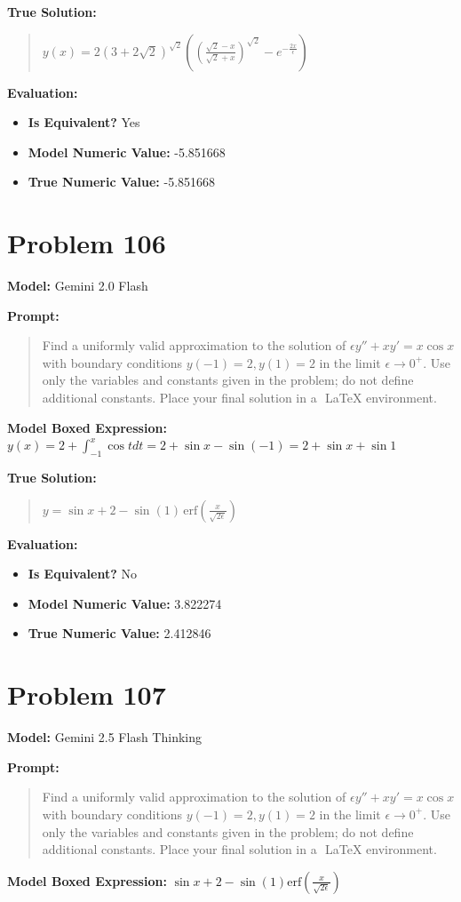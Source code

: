 \documentclass{article}
\begin{document}
{\textbf{True Solution:}
\begin{quote}
$y(x)=2(3+2\sqrt{2})^\sqrt{2}((\frac{\sqrt{2}-x}{\sqrt{2}+x})^\sqrt{2}-e^{-\frac{2x}{\epsilon}})$
\end{quote}

\textbf{Evaluation:}
\begin{itemize}
\item \textbf{Is Equivalent?} Yes
\item \textbf{Model Numeric Value:} -5.851668
\item \textbf{True Numeric Value:} -5.851668
\end{itemize}
\vspace{1cm}
\section*{Problem 106}
\textbf{Model:} Gemini 2.0 Flash

\textbf{Prompt:}
\begin{quote}
Find a uniformly valid approximation to the solution of $\epsilon y'' + x y' = x \cos x$ with boundary conditions $y(-1) = 2, y(1) = 2$ in the limit $\epsilon \to 0^+$. Use only the variables and constants given in the problem; do not define additional constants. Place your final solution in a $\boxed{}$ LaTeX environment.
\end{quote}
\textbf{Model Boxed Expression:} $y(x) = 2 + \int_{-1}^x \cos t dt = 2 + \sin x - \sin(-1) = 2 + \sin x + \sin 1$

\textbf{True Solution:}
\begin{quote}
$y = \sin x + 2 - \sin(1) \, \mathrm{erf}\left(\frac{x}{\sqrt{2\epsilon}}\right)$
\end{quote}

\textbf{Evaluation:}
\begin{itemize}
\item \textbf{Is Equivalent?} No
\item \textbf{Model Numeric Value:} 3.822274
\item \textbf{True Numeric Value:} 2.412846
\end{itemize}
\vspace{1cm}
\section*{Problem 107}
\textbf{Model:} Gemini 2.5 Flash Thinking

\textbf{Prompt:}
\begin{quote}
Find a uniformly valid approximation to the solution of $\epsilon y'' + x y' = x \cos x$ with boundary conditions $y(-1) = 2, y(1) = 2$ in the limit $\epsilon \to 0^+$. Use only the variables and constants given in the problem; do not define additional constants. Place your final solution in a $\boxed{}$ LaTeX environment.
\end{quote}
\textbf{Model Boxed Expression:} $\sin x + 2 - \sin(1)\text{erf}\left(\frac{x}{\sqrt{2\epsilon}}\right)$

}
\end{document}
